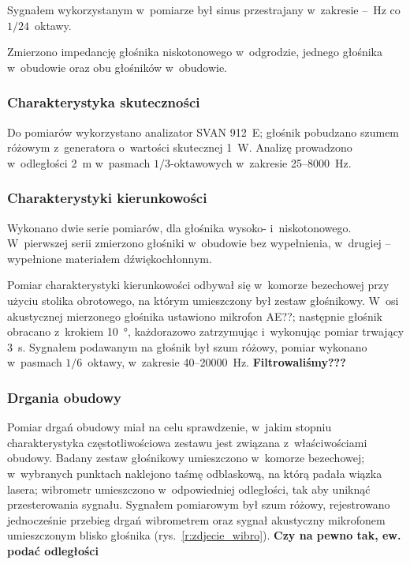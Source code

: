 \documentclass[12pt]{oska}
\begin{document}
			
			Sygnałem wykorzystanym w~pomiarze był sinus przestrajany w~zakresie \num{}--\num{}~\si{\Hz} co $1/24$~oktawy.
			
			Zmierzono impedancję głośnika niskotonowego w~odgrodzie, jednego głośnika w~obudowie oraz obu głośników w~obudowie.
			
		\subsubsection{Charakterystyka skuteczności}
			
			Do pomiarów wykorzystano analizator SVAN 912~E; głośnik pobudzano szumem różowym z~generatora o~wartości skutecznej \SI{1}{\watt}. Analizę prowadzono w~odległości \SI{2}{\metre} w~pasmach $1/3$-oktawowych w~zakresie \num{25}--\num{8000}~\si{\Hz}.
			
		\subsubsection{Charakterystyki kierunkowości}
			
			Wykonano dwie serie pomiarów, dla głośnika wysoko- i~niskotonowego. W~pierwszej serii zmierzono głośniki w~obudowie bez wypełnienia, w~drugiej -- wypełnione materiałem dźwiękochłonnym.
			
			Pomiar charakterystyki kierunkowości odbywał się w~komorze bezechowej przy użyciu stolika obrotowego, na którym umieszczony był zestaw głośnikowy. W~osi akustycznej mierzonego głośnika ustawiono mikrofon AE??; następnie głośnik obracano z~krokiem \SI{10}{\degree}, każdorazowo zatrzymując i~wykonując pomiar trwający \SI{3}{\s}. Sygnałem podawanym na głośnik był szum różowy, pomiar wykonano w~pasmach $1/6$~oktawy, w~zakresie \num{40}--\num{20000}~\si{\Hz}. \color{red} \textbf{Filtrowaliśmy???}\color{black}

			
		\subsubsection{Drgania obudowy}
			
			Pomiar drgań obudowy miał na celu sprawdzenie, w~jakim stopniu charakterystyka częstotliwościowa zestawu jest związana z~właściwościami obudowy. Badany zestaw głośnikowy umieszczono w~komorze bezechowej; w~wybranych punktach naklejono taśmę odblaskową, na którą padała wiązka lasera; wibrometr umieszczono w~odpowiedniej odległości, tak aby uniknąć przesterowania sygnału. Sygnałem pomiarowym był szum różowy, rejestrowano jednocześnie przebieg drgań wibrometrem oraz sygnał akustyczny mikrofonem umieszczonym blisko głośnika (rys.~\ref{r:zdjecie_wibro}). \color{red} \textbf{Czy na pewno tak, ew. podać odległości} \color{black}
			
\end{document}
